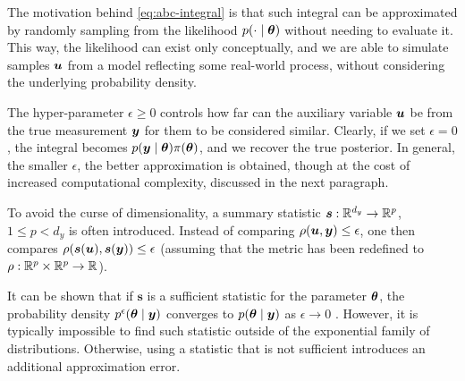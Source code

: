 The motivation behind \eqref{eq:abc-integral} is that such integral can be approximated by randomly sampling from the likelihood $p(\cdot \mid \bm{\theta})$ without needing to evaluate it. This way, the likelihood can exist only conceptually, and we are able to simulate samples $\bm{u}$ from a model reflecting some real-world process, without considering the underlying probability density.

The hyper-parameter $\epsilon \geq 0$ controls how far can the auxiliary variable $\bm{u}$ be from the true measurement $\bm{y}$ for them to be considered similar. Clearly, if we set $\epsilon = 0$, the integral becomes $p(\bm{y} \mid \bm{\theta}) \pi(\bm{\theta})$, and we recover the true posterior. In general, the smaller $\epsilon$, the better approximation is obtained, though at the cost of increased computational complexity, discussed in the next paragraph.

To avoid the curse of dimensionality, a summary statistic $\bm{s}: \mathbb{R}^{d_y} \to \mathbb{R}^p$, $1 \leq p < d_y$ is often introduced. Instead of comparing $\rho(\bm{u}, \bm{y}) \leq \epsilon$, one then compares $\rho(\bm{s}(\bm{u}), \bm{s}(\bm{y})) \leq \epsilon$ (assuming that the metric has been redefined to $\rho: \mathbb{R}^p \times \mathbb{R}^p \to \mathbb{R}$).

It can be shown that if $\bm{s}$ is a sufficient statistic for the parameter $\bm{\theta}$, the probability density $p^\epsilon(\bm{\theta} \mid \bm{y})$ converges to $p(\bm{\theta} \mid \bm{y})$ as $\epsilon \to 0$ \citep{jasra-time-series}. However, it is typically impossible to find such statistic outside of the exponential family of distributions. Otherwise, using a statistic that is not sufficient introduces an additional approximation error.

